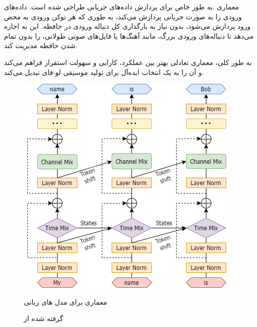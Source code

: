 معماری  .به طور خاص برای پردازش داده‌های جریانی طراحی شده است.  داده‌های ورودی را به صورت جریانی پردازش می‌کند، به طوری که هر توکن ورودی به محض ورود پردازش می‌شود، بدون نیاز به بارگذاری کل دنباله ورودی در حافظه. این به  اجازه می‌دهد تا دنباله‌های ورودی بزرگ، مانند آهنگ‌ها یا فایل‌های صوتی طولانی، را بدون تمام شدن حافظه مدیریت کند.

به طور کلی، معماری  تعادلی بهتر بین عملکرد، کارایی و سهولت استقرار فراهم می‌کند و آن را به یک انتخاب ایده‌آل برای تولید موسیقی لو-فای تبدیل می‌کند.
\begin{figure}[!htb]
      \centering
      \includegraphics[scale=0.5]{Figures/RWKV-arch.png}
      \caption{معماری  برای مدل های زبانی}
      \vspace{0.7em}
      \caption*{گرفته شده از \cite{RWKV}}
      \label{Fig:RWKV}
\end{figure}

